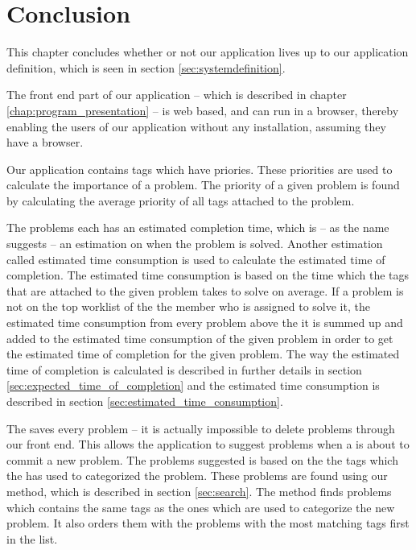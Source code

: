 \chapter{Conclusion}
\label{chap:conclusion}
\emptyTop{}
This chapter concludes whether or not our application lives up to our application definition, which is seen in section \ref{sec:systemdefinition}.

The front end part of our application -- which is described in chapter \ref{chap:program_presentation} -- is web based, and can run in a browser, thereby enabling the users of our application without any installation, assuming they have a browser.

Our application contains tags which have priories.
These priorities are used to calculate the importance of a problem.
The priority of a given problem is found by calculating the average priority of all tags attached to the problem.

The problems each has an estimated completion time, which is -- as the name suggests -- an estimation on when the problem is solved.
Another estimation called estimated time consumption is used to calculate the estimated time of completion.
The estimated time consumption is based on the time which the tags that are attached to the given problem takes to solve on average.
If a problem is not on the top worklist of the the \astaff[] member who is assigned to solve it, the estimated time consumption from every problem above the it is summed up and added to the estimated time consumption of the given problem in order to get the estimated time of completion for the given problem.
The way the estimated time of completion is calculated is described in further details in section \ref{sec:expected_time_of_completion} and the estimated time consumption is described in section \ref{sec:estimated_time_consumption}.

The \hdesk[] saves every problem -- it is actually impossible to delete problems through our front end.
This allows the application to suggest problems when a \aclient[] is about to commit a new problem.
The problems suggested is based on the the tags which the \aclient[] has used to categorized the problem.
These problems are found using our  method, which is described in section \ref{sec:search}.
The  method finds problems which contains the same tags  as the ones which are used to categorize the new problem.
It also orders them with the problems with the most matching tags first in the list.

